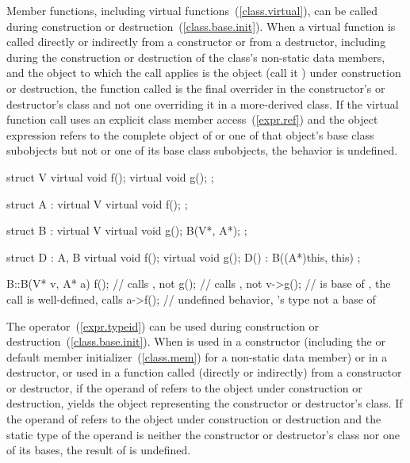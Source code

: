 \pnum
{}%
%
%
%
Member functions, including virtual functions~(\ref{class.virtual}), can be called
during construction or destruction~(\ref{class.base.init}).
When a virtual function is called directly or indirectly from a constructor
or from a destructor,
including during the construction or destruction of the class's non-static data
members,
and the object to which the call applies is the object (call it ) under construction or
destruction,
the function called is the
final overrider in the constructor's or destructor's class and not one
overriding it in a more-derived class.
If the virtual function call uses an explicit class member access~(\ref{expr.ref})
and the object expression refers to
the complete object of  or one of that object's base class subobjects
but not  or one of its base class subobjects, the behavior
is undefined.
\enterexample

\begin{codeblock}
struct V {
  virtual void f();
  virtual void g();
};

struct A : virtual V {
  virtual void f();
};

struct B : virtual V {
  virtual void g();
  B(V*, A*);
};

struct D : A, B {
  virtual void f();
  virtual void g();
  D() : B((A*)this, this) { }
};

B::B(V* v, A* a) {
  f();              // calls , not 
  g();              // calls , not 
  v->g();           //  is base of , the call is well-defined, calls 
  a->f();           // undefined behavior, 's type not a base of 
}
\end{codeblock}
\exitexample

\pnum
{}%
%
%
%
The
operator~(\ref{expr.typeid}) can be used during construction or destruction~(\ref{class.base.init}).
When
is used in a constructor (including the
 or default member initializer~(\ref{class.mem})
for a non-static data member)
or in a destructor, or used in a function called (directly or indirectly) from
a constructor or destructor, if the operand of
refers to the object under construction or destruction,
yields the
object representing the constructor or destructor's class.
If the operand of
refers to the object under construction or destruction and the static type of
the operand is neither the constructor or destructor's class nor one of its
bases, the result of
is undefined.

